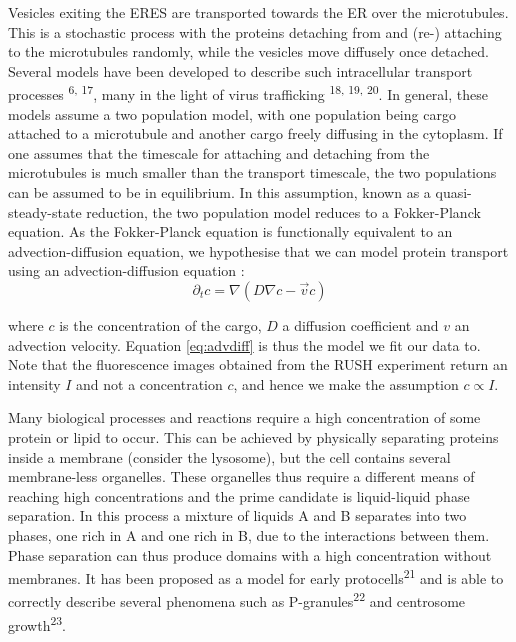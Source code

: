 \documentclass{Dissertate}
\begin{document}
Vesicles exiting the ERES are transported towards the ER over the
microtubules. This is a stochastic process with the proteins detaching
from and (re-) attaching to the microtubules randomly, while the
vesicles move diffusely once detached. Several models have been
developed to describe such intracellular transport processes \textsuperscript{6, 17},
many in the light of virus trafficking \textsuperscript{18, 19, 20}. In general, these
models assume a two population model, with one population being cargo
attached to a microtubule and another cargo freely diffusing in the
cytoplasm. If one assumes that the timescale for attaching and detaching
from the microtubules is much smaller than the transport timescale, the
two populations can be assumed to be in equilibrium. In this assumption,
known as a quasi-steady-state reduction, the two population model
reduces to a Fokker-Planck equation. As the Fokker-Planck equation is
functionally equivalent to an advection-diffusion equation, we
hypothesise that we can model protein transport using an
advection-diffusion equation
: 
\begin{equation}
	\label{eq:advdiff}
	\partial_t c = \nabla (D\nabla c-\vec{v} c)
\end{equation}

 where \(c\) is the concentration of the cargo, \(D\) a diffusion
coefficient and \(v\) an advection velocity. Equation \ref{eq:advdiff}
is thus the model we fit our data to. Note that the fluorescence images
obtained from the RUSH experiment return an intensity \(I\) and not a
concentration \(c\), and hence we make the assumption \(c \propto I\).

Many biological processes and reactions require a high concentration of
some protein or lipid to occur. This can be achieved by physically
separating proteins inside a membrane (consider the lysosome), but the
cell contains several membrane-less organelles. These organelles thus
require a different means of reaching high concentrations and the prime
candidate is liquid-liquid phase separation. In this process a mixture
of liquids A and B separates into two phases, one rich in
A and one rich in B, due to the interactions between them. Phase
separation can thus produce domains with a high
concentration without membranes. It has been proposed as a model for early
protocells\textsuperscript{21} and is able to correctly describe several
phenomena such as P-granules\textsuperscript{22} and centrosome
growth\textsuperscript{23}.
\end{document}
